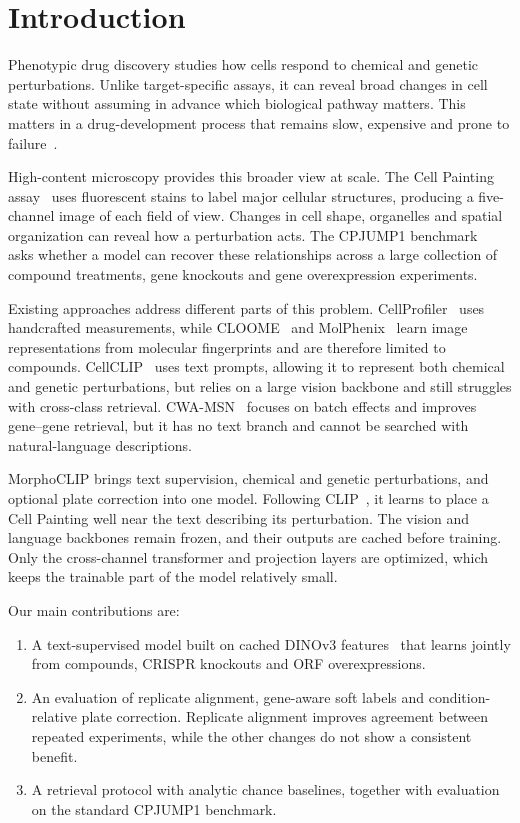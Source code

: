 \section{Introduction}

Phenotypic drug discovery studies how cells respond to chemical and genetic perturbations. Unlike
target-specific assays, it can reveal broad changes in cell state without assuming in advance which
biological pathway matters. This matters in a drug-development process that remains slow, expensive
and prone to failure~\cite{wouters2020rdcost,sun2022clinicaltrials}.

High-content microscopy provides this broader view at scale. The Cell Painting
assay~\cite{bray2016cellpainting, seal2024cellpainting} uses fluorescent stains to label major
cellular structures, producing a five-channel image of each field of view. Changes in cell shape,
organelles and spatial organization can reveal how a perturbation acts. The CPJUMP1
benchmark~\cite{chandrasekaran2024jump} asks whether a model can recover these relationships across
a large collection of compound treatments, gene knockouts and gene overexpression experiments.

Existing approaches address different parts of this problem.
CellProfiler~\cite{carpenter2006cellprofiler} uses handcrafted measurements, while
CLOOME~\cite{sanchez2023cloome} and MolPhenix~\cite{fradkin2024molphenix} learn image
representations from molecular fingerprints and are therefore limited to compounds.
CellCLIP~\cite{lu2025cellclip} uses text prompts, allowing it to represent both chemical and
genetic perturbations, but relies on a large vision backbone and still struggles with cross-class
retrieval. CWA-MSN~\cite{huang2025cwamsn} focuses on batch effects and improves gene--gene
retrieval, but it has no text branch and cannot be searched with natural-language descriptions.

MorphoCLIP brings text supervision, chemical and genetic perturbations, and optional plate
correction into one model. Following CLIP~\cite{radford2021clip}, it learns to place a Cell
Painting well near the text describing its perturbation. The vision and language backbones remain
frozen, and their outputs are cached before training. Only the cross-channel transformer and
projection layers are optimized, which keeps the trainable part of the model relatively small.

Our main contributions are:
\begin{enumerate}
  \item A text-supervised model built on cached DINOv3 features~\cite{simeoni2025dinov3} that
        learns jointly from compounds, CRISPR knockouts and ORF overexpressions.
  \item An evaluation of replicate alignment, gene-aware soft labels and condition-relative plate
        correction. Replicate alignment improves agreement between repeated experiments, while
        the other changes do not show a consistent benefit.
  \item A retrieval protocol with analytic chance baselines, together with evaluation on the
        standard CPJUMP1 benchmark.
\end{enumerate}
